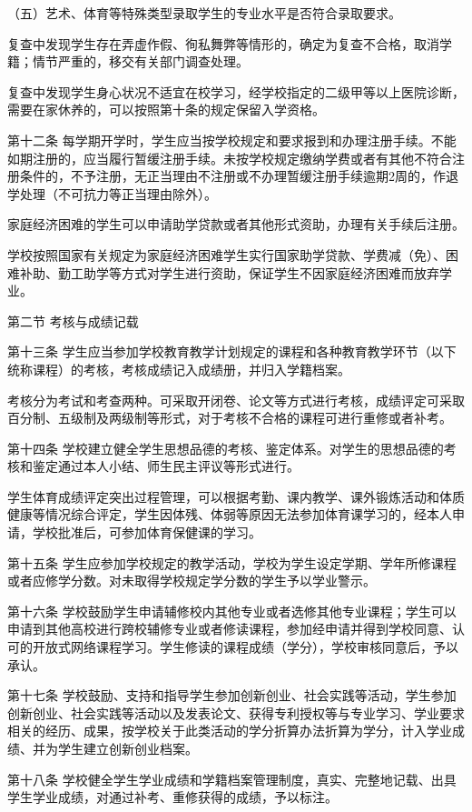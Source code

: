 \documentclass[UTF8,12pt,a4paper]{report}
\begin{document}
（五）艺术、体育等特殊类型录取学生的专业水平是否符合录取要求。

复查中发现学生存在弄虚作假、徇私舞弊等情形的，确定为复查不合格，取消学籍；情节严重的，移交有关部门调查处理。

复查中发现学生身心状况不适宜在校学习，经学校指定的二级甲等以上医院诊断，需要在家休养的，可以按照第十条的规定保留入学资格。

第十二条 每学期开学时，学生应当按学校规定和要求报到和办理注册手续。不能如期注册的，应当履行暂缓注册手续。未按学校规定缴纳学费或者有其他不符合注册条件的，不予注册，无正当理由不注册或不办理暂缓注册手续逾期2周的，作退学处理（不可抗力等正当理由除外）。

家庭经济困难的学生可以申请助学贷款或者其他形式资助，办理有关手续后注册。

学校按照国家有关规定为家庭经济困难学生实行国家助学贷款、学费减（免）、困难补助、勤工助学等方式对学生进行资助，保证学生不因家庭经济困难而放弃学业。

第二节 考核与成绩记载

第十三条 学生应当参加学校教育教学计划规定的课程和各种教育教学环节（以下统称课程）的考核，考核成绩记入成绩册，并归入学籍档案。　　

考核分为考试和考查两种。可采取开闭卷、论文等方式进行考核，成绩评定可采取百分制、五级制及两级制等形式，对于考核不合格的课程可进行重修或者补考。

第十四条 学校建立健全学生思想品德的考核、鉴定体系。对学生的思想品德的考核和鉴定通过本人小结、师生民主评议等形式进行。

学生体育成绩评定突出过程管理，可以根据考勤、课内教学、课外锻炼活动和体质健康等情况综合评定，学生因体残、体弱等原因无法参加体育课学习的，经本人申请，学校批准后，可参加体育保健课的学习。

第十五条 学生应参加学校规定的教学活动，学校为学生设定学期、学年所修课程或者应修学分数。对未取得学校规定学分数的学生予以学业警示。

第十六条 学校鼓励学生申请辅修校内其他专业或者选修其他专业课程；学生可以申请到其他高校进行跨校辅修专业或者修读课程，参加经申请并得到学校同意、认可的开放式网络课程学习。学生修读的课程成绩（学分），学校审核同意后，予以承认。

第十七条 学校鼓励、支持和指导学生参加创新创业、社会实践等活动，学生参加创新创业、社会实践等活动以及发表论文、获得专利授权等与专业学习、学业要求相关的经历、成果，按学校关于此类活动的学分折算办法折算为学分，计入学业成绩、并为学生建立创新创业档案。

第十八条 学校健全学生学业成绩和学籍档案管理制度，真实、完整地记载、出具学生学业成绩，对通过补考、重修获得的成绩，予以标注。
\end{document}
